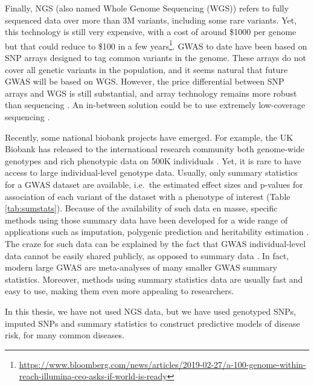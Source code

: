 Finally, NGS (also named Whole Genome Sequencing (WGS)) refers to fully sequenced data over more than 3M variants, including some rare variants. Yet, this technology is still very expensive, with a cost of around \$1000 per genome but that could reduce to \$100 in a few years\footnote{\url{https://www.bloomberg.com/news/articles/2019-02-27/a-100-genome-within-reach-illumina-ceo-asks-if-world-is-ready}}.
GWAS to date have been based on SNP arrays designed to tag common variants in the genome. These arrays do not cover all genetic variants in the population, and it seems natural that future GWAS will be based on WGS. However, the price differential between SNP arrays and WGS is still substantial, and array technology remains more robust than sequencing \cite[]{visscher201710}. An in-between solution could be to use extremely low-coverage sequencing \cite[]{pasaniuc2012extremely}.

Recently, some national biobank projects have emerged. For example, the UK Biobank has released to the international research community both genome-wide genotypes and rich phenotypic data on 500K individuals \cite[]{bycroft2017genome}.
Yet, it is rare to have access to large individual-level genotype data. 
Usually, only summary statistics for a GWAS dataset are available, i.e.\ the estimated effect sizes and p-values for association of each variant of the dataset with a phenotype of interest (Table \ref{tab:sumstats}). Because of the availability of such data en masse, specific methods using those summary data have been developed for a wide range of applications such as imputation, polygenic prediction and heritability estimation \cite[]{pasaniuc2014fast,vilhjalmsson2015modeling,bulik2015ld,pasaniuc2017dissecting,speed2018sumher}. The craze for such data can be explained by the fact that GWAS individual-level data cannot be easily shared publicly, as opposed to summary data \cite[]{lin2010meta}.
In fact, modern large GWAS are meta-analyses of many smaller GWAS summary statistics.
Moreover, methods using summary statistics data are usually fast and easy to use, making them even more appealing to researchers.

In this thesis, we have not used NGS data, but we have used genotyped SNPs, imputed SNPs and summary statistics to construct predictive models of disease risk, for many common diseases.

